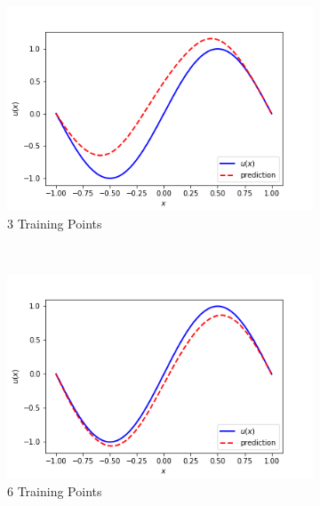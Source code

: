 \documentclass{article}
\begin{document}
\begin{figure}[htbp]
\center
    \begin{subfigure}{0.45\textwidth}
        \includegraphics[width=\textwidth]{figures/3TrainingPoints}
        \caption{3 Training Points}
    \end{subfigure}
    ~ %
    \begin{subfigure}{0.45\textwidth}
        \includegraphics[width=\textwidth]{figures/6TrainingPoints}
        \caption{6 Training Points}
    \end{subfigure}
        ~ %
    \begin{subfigure}{0.45\textwidth}

\end{subfigure}
\end{figure}
\end{document}
